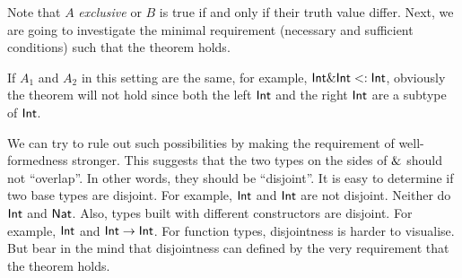 Note that $A$ \emph{exclusive} or $B$ is true if and only if their truth value
differ. Next, we are going to investigate the minimal requirement (necessary and
sufficient conditions) such that the theorem holds.

If $A_1$ and $A_2$ in this setting are the same, for example,
$\textsf{Int} \& \textsf{Int} <: \textsf{Int}$, obviously the theorem will
not hold since both the left $\textsf{Int}$ and the right $\textsf{Int}$ are a
subtype of $\textsf{Int}$.

We can try to rule out such possibilities by making the requirement of
well-formedness stronger. This suggests that the two types on the sides of
$\&$ should not ``overlap''. In other words, they should be ``disjoint''. It
is easy to determine if two base types are disjoint. For example, $\textsf{Int}$
and $\textsf{Int}$ are not disjoint. Neither do $\textsf{Int}$ and $\textsf{Nat}$.
Also, types built with different constructors are disjoint. For example,
$\textsf{Int}$ and $\textsf{Int} \to \textsf{Int}$. For function types, disjointness
is harder to visualise. But bear in the mind that disjointness can defined by
the very requirement that the theorem holds.
